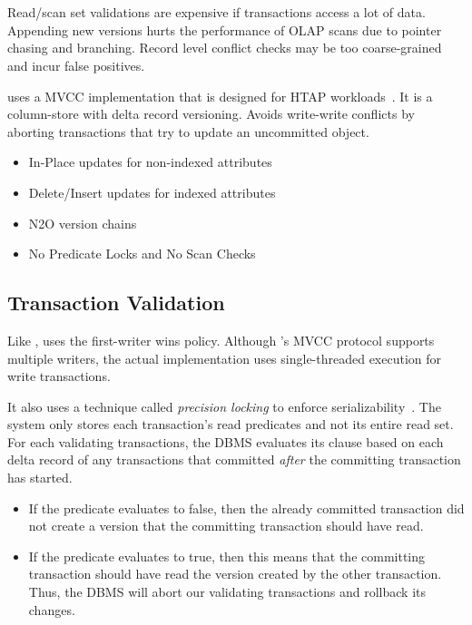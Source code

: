 \documentclass[11pt]{article}
\begin{document}
\section{}
Read/scan set validations are expensive if transactions access a lot of data. Appending new versions 
hurts the performance of OLAP scans due to pointer chasing and branching. Record level conflict 
checks may be too coarse-grained and incur false positives.

 uses a MVCC implementation that is designed for HTAP workloads~\cite{p677-neumann}. 
It is a column-store with delta record versioning. Avoids write-write conflicts by aborting 
transactions that try to update an uncommitted object.
\begin{itemize}
    \item In-Place updates for non-indexed attributes
    \item Delete/Insert updates for indexed attributes
    \item N2O version chains
    \item No Predicate Locks and No Scan Checks
\end{itemize}

\subsection*{Transaction Validation}
Like ,  uses the first-writer wins policy.
Although 's MVCC protocol supports multiple writers, the actual implementation uses 
single-threaded execution for write transactions.

It also uses a technique called \textit{precision locking} to enforce 
serializability~\cite{jordan81}. The system only stores each transaction's read predicates 
and not its entire read set.
For each validating transactions, the DBMS evaluates its  clause based on each delta 
record of any transactions that committed \textit{after} the committing transaction has started.
\begin{itemize}
    \item
    If the predicate evaluates to false, then the already committed transaction did not create 
    a version that the committing transaction should have read.
        
    \item
    If the predicate evaluates to true, then this means that the committing transaction should have 
    read the version created by the other transaction. Thus, the DBMS will abort our validating     
    transactions and rollback its changes.
\end{itemize}
\end{document}
